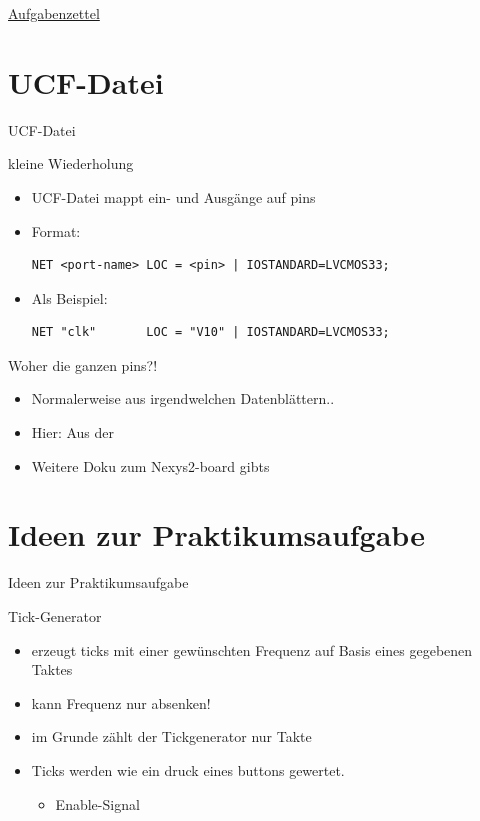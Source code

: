\documentclass[aspectratio=169,presentation]{beamer}
\newcommand{\sectionframe}[1]{
	\begin{frame}
		\vfill
		\Huge
		\centering
		\usebeamercolor[fg]{title}
		#1
		\vfill
		\par
	\end{frame}
}
\begin{document}
\sectionframe{\href{http://users.informatik.haw-hamburg.de/~schafers/LOCAL/S19S_CE/Aufgabenzettel_Nr1_v15.pdf}{Aufgabenzettel}}

\section{UCF-Datei}
\sectionframe{UCF-Datei}
\begin{frame} [fragile] {kleine Wiederholung}
	\begin{itemize}
		\item UCF-Datei mappt ein- und Ausgänge auf pins
		\item Format:
		\begin{lstlisting}
NET <port-name> LOC = <pin> | IOSTANDARD=LVCMOS33;
		\end{lstlisting}
		\item Als Beispiel:
		\begin{lstlisting}
NET "clk"		LOC = "V10" | IOSTANDARD=LVCMOS33;
		\end{lstlisting}
	\end{itemize}
\end{frame}

\begin{frame} [fragile] {Woher die ganzen pins?!}
	\begin{itemize}
		\item Normalerweise aus irgendwelchen Datenblättern..
		\item Hier: Aus der 
		\href{https://users.informatik.haw-hamburg.de/~behn/pub/CEP/FPGA_CE Board.pdf}{}
		\item Weitere Doku zum Nexys2-board gibts \href{http://users.informatik.haw-hamburg.de/~schafers/LOCAL/S19S_CE/DOCU/OLD Digilent Nexys2 Board Reference Manual.pdf}{\color{red}{HIER}}
	\end{itemize}
\end{frame}


\section{Ideen zur Praktikumsaufgabe}
\sectionframe{Ideen zur Praktikumsaufgabe}
\begin{frame} {Tick-Generator}
	\begin{itemize}
		\item erzeugt ticks mit einer gewünschten Frequenz auf Basis eines gegebenen Taktes
		\item kann Frequenz nur absenken!
		\item im Grunde zählt der Tickgenerator nur Takte\\
		\item Ticks werden wie ein druck eines buttons gewertet.
		\begin{itemize}
			 \item Enable-Signal
		\end{itemize}
	\end{itemize}
\end{frame}
\end{document}
